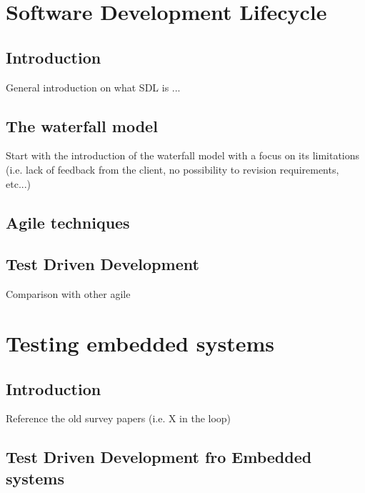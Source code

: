 \newpage
\section{Software Development Lifecycle}
\subsection{Introduction}
General introduction on what SDL is ...

\subsection{The waterfall model}
Start with the introduction of the waterfall model with a focus on its limitations (i.e. lack of feedback from the client, no possibility to revision requirements, etc...)


\subsection{Agile techniques}


\subsection{Test Driven Development}
Comparison with other agile 




\section{Testing embedded systems}
\subsection{Introduction}
Reference the old survey papers (i.e. X in the loop)


\subsection{Test Driven Development fro Embedded systems}